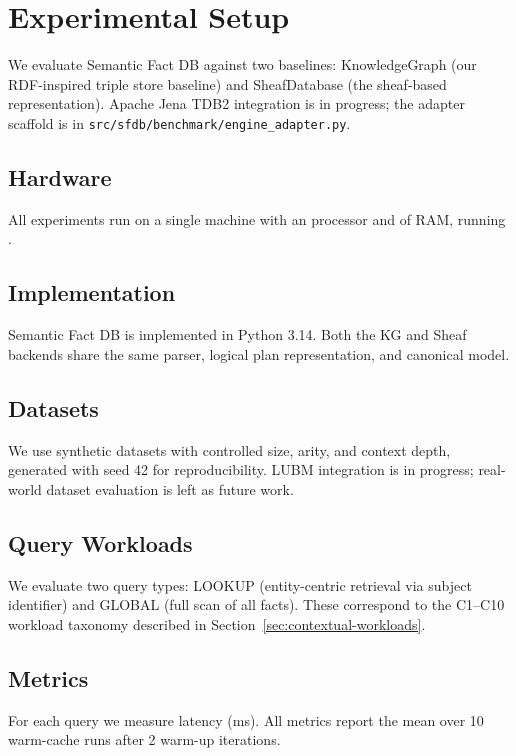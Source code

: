 \section{Experimental Setup}
\label{sec:experimental-setup}

We evaluate Semantic Fact DB against two baselines:
KnowledgeGraph (our RDF-inspired triple store baseline) and
SheafDatabase (the sheaf-based representation).
Apache Jena TDB2 integration is in progress; the adapter
scaffold is in \texttt{src/sfdb/benchmark/engine\_adapter.py}.

\subsection{Hardware}
All experiments run on a single machine with an
\texttt{\showcpu}
processor and
\texttt{\showmemory}
of RAM, running
\texttt{\showos}.

\subsection{Implementation}
Semantic Fact DB is implemented in Python 3.14.
Both the KG and Sheaf backends share the same
parser, logical plan representation, and canonical model.

\subsection{Datasets}
We use synthetic datasets with controlled size, arity, and context depth,
generated with seed 42 for reproducibility.
LUBM integration is in progress; real-world dataset
evaluation is left as future work.

\subsection{Query Workloads}
We evaluate two query types: LOOKUP (entity-centric retrieval via
subject identifier) and GLOBAL (full scan of all facts).
These correspond to the C1--C10 workload taxonomy described in
Section~\ref{sec:contextual-workloads}.

\subsection{Metrics}
For each query we measure latency (ms).
All metrics report the mean over 10 warm-cache runs
after 2 warm-up iterations.
